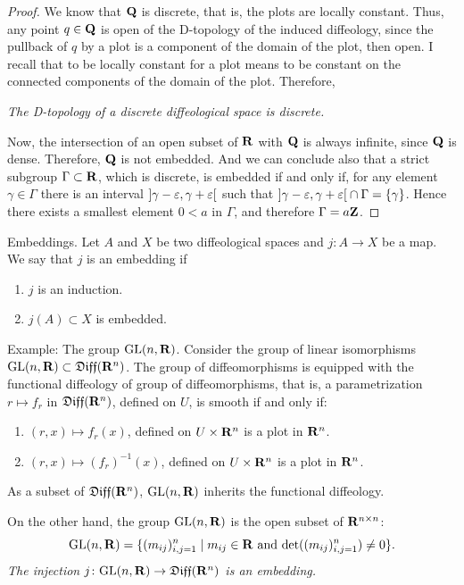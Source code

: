 \begin{proof}
  We know that $\mathbf{Q}$ is discrete,
  that is,
  the plots are locally constant.
  Thus,
  any point $q \in \mathbf{Q}$ is open of the D-topology of the induced diffeology,
  since the pullback of $q$ by a plot is a component of the domain of the plot,
  then open.
  I recall that to be locally constant for a plot means to be constant on the connected components of the domain of the plot.
  Therefore,

   {\itshape The D-topology of a discrete diffeological space is discrete.}

  Now,
  the intersection of an open subset of $\mathbf{R}$ with $\mathbf{Q}$ is always infinite,
  since $\mathbf{Q}$ is dense.
  Therefore,
  $\mathbf{Q}$ is not embedded.
  And we can conclude also that a strict subgroup $\Gamma \subset \mathbf{R}$,
  which is discrete,
  is embedded if and only if,
  for any element $\gamma \in \Gamma$ there is an interval $\mathopen] \gamma-\varepsilon, \gamma + \varepsilon \mathclose[$ such that  $\mathopen] \gamma-\varepsilon, \gamma + \varepsilon \mathclose[ \cap \Gamma = \{\gamma\}$.
  Hence there exists a smallest element $0 < a$ in $\Gamma$,
  and therefore $\Gamma = a \mathbf{Z}$.
\end{proof}

\begin{Article}{Embeddings.}{}
  Let $A$ and $X$ be two diffeological spaces and $j \colon A \to X$ be a map.
  We say that $j$ is an embedding if
  \begin{enumerate}
    \item $j$ is an induction.
    \item $j(A) \subset X$ is embedded.
  \end{enumerate}
\end{Article}

\begin{Article}{Example: The group $\mathrm{GL}(n,\mathbf{R})$.}{}
  Consider the group of linear isomorphisms $\mathrm{GL}(n,\mathbf{R}) \subset \mathfrak{Diff}(\mathbf{R}^n)$.
  The group of diffeomorphisms is equipped with the functional diffeology of group of diffeomorphisms,
  that is,
  a parametrization $r \mapsto f_r$ in $\mathfrak{Diff}(\mathbf{R}^n)$,
  defined on $U$,
  is smooth if and only if:
  \begin{enumerate}
    \item $(r,x) \mapsto f_r(x)$,
    defined on $U \times \mathbf{R}^n$ is a plot in $\mathbf{R}^n$.
    \item $(r,x) \mapsto (f_r)^{-1}(x)$,
    defined on $U \times \mathbf{R}^n$ is a plot in $\mathbf{R}^n$.
  \end{enumerate}
  As a subset of $\mathfrak{Diff}(\mathbf{R}^n)$,
  $\mathrm{GL}(n,\mathbf{R})$ inherits the functional diffeology.

  On the other hand,
  the group $\mathrm{GL}(n,\mathbf{R})$ is the open subset of $\mathbf{R}^{n \times n}$:
  $$%
    \GL(n,\RR) = \{ (m_{ij})_{i,j = 1}^n \mid m_{ij} \in \RR \text{ and } \det((m_{ij})_{i,j = 1}^n) \neq 0 \}.
  $$%
   {\itshape The injection $j \colon \mathrm{GL}(n,\mathbf{R}) \to \mathfrak{Diff}(\mathbf{R}^n)$ is an embedding.}
\end{Article}

